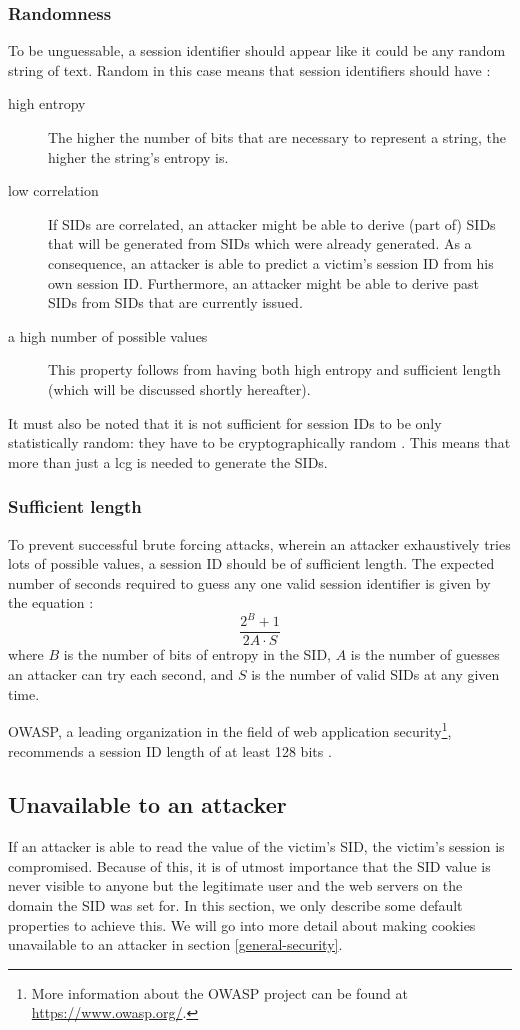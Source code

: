 \subsubsection{Randomness}
To be unguessable, a session identifier should appear like it could be any random string of text. Random in this case means that session identifiers should have \cite{Nikiforakis2010, Farrell2011, rfc4086}:
\begin{description}
	\item[high entropy] The higher the number of bits that are necessary to represent a string, the higher the string's entropy is.
	\item[low correlation] If SIDs are correlated, an attacker might be able to derive (part of) SIDs that will be generated from SIDs which were already generated. As a consequence, an attacker is able to predict a victim's session ID from his own session ID. Furthermore, an attacker might be able to derive past SIDs from SIDs that are currently issued.
	\item[a high number of possible values] This property follows from having both high entropy and sufficient length (which will be discussed shortly hereafter).
\end{description}
It must also be noted that it is not sufficient for session IDs to be only statistically random: they have to be cryptographically random \cite{Fu2001}. This means that more than just a \gls{lcg} \cite{Cools2010}
is needed to generate the SIDs.

\subsubsection{Sufficient length}
To prevent successful brute forcing attacks, wherein an attacker exhaustively tries lots of possible values, a session ID should be of sufficient length. The expected number of seconds required to guess any one valid session identifier is given by the equation \cite{OWASP2009a}:
\[
	\frac{2^B + 1}{2A \cdot S}
\]
where $B$ is the number of bits of entropy in the SID, $A$ is the number of guesses an attacker can try each second, and $S$ is the number of valid SIDs at any given time.

OWASP, a leading organization in the field of web application security\footnote{More information about the OWASP project can be found at \url{https://www.owasp.org/}.}, recommends a session ID length of at least 128 bits \cite{OWASP2009a}.

\subsection{Unavailable to an attacker}
If an attacker is able to read the value of the victim's SID, the victim's session is compromised. Because of this, it is of utmost importance that the SID value is never visible to anyone but the legitimate user and the web servers on the domain the SID was set for. In this section, we only describe some default properties to achieve this. We will go into more detail about making cookies unavailable to an attacker in section \ref{general-security}.

